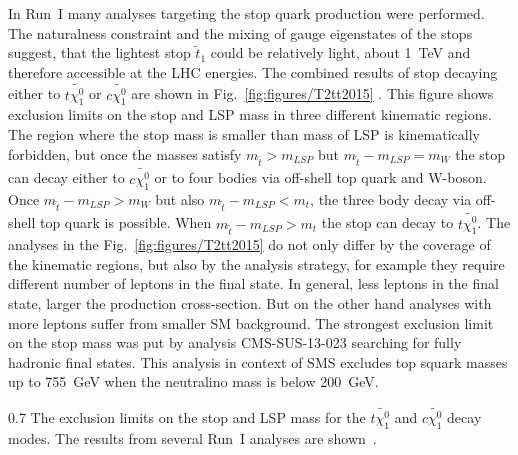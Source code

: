 In Run~I many analyses targeting the stop quark production were performed. The naturalness constraint and the mixing of gauge eigenstates of the stops suggest, that the lightest stop $\tilde{t}_{1}$ could be relatively light, about 1~TeV and therefore accessible at the LHC energies. The combined results of stop decaying either to $t \tilde{\chi_{1}^0}$ or $c \tilde{\chi_{1}^0}$ are shown in Fig.~\ref{fig:figures/T2tt2015} . This figure shows exclusion limits on the stop and LSP mass in three different kinematic regions. The region where the stop mass is smaller than mass of LSP is kinematically forbidden, but once the masses satisfy $m_{\tilde{t}} > m_{LSP}$ but $m_{\tilde{t}} - m_{LSP} = m_{W}$ the stop can decay either to $c \tilde{\chi_{1}^0}$ or to four bodies via off-shell top quark and W-boson. Once  $m_{\tilde{t}} - m_{LSP} > m_{W}$ but also  $m_{\tilde{t}} - m_{LSP} < m_{t}$, the three body decay via off-shell top quark is possible. When  $m_{\tilde{t}} - m_{LSP} > m_{t}$  the stop can decay to $t \tilde{\chi_{1}^0}$. The analyses in the Fig.~\ref{fig:figures/T2tt2015} do not only differ by the coverage of the kinematic regions, but also by the analysis strategy, for example they require different number of leptons in the final state. In general, less leptons in the final state, larger the production cross-section. But on the other hand analyses with more leptons suffer from smaller SM background.  The strongest exclusion limit on the stop mass was put by analysis CMS-SUS-13-023 searching for fully hadronic final states. This analysis in context of SMS excludes top squark masses up to 755~GeV when the neutralino mass is below 200~GeV.


                 {0.7}       %
                { The exclusion limits on the stop and LSP mass for the $t \tilde{\chi_{1}^0}$ and $c \tilde{\chi_{1}^0}$ decay modes. The results from several Run~I analyses are shown~\cite{website:SUSYresRunI}.   } %

\newpage
